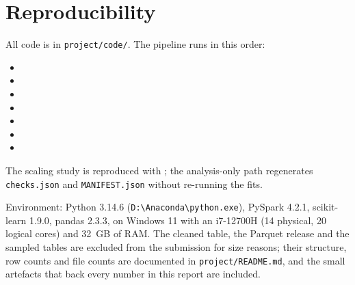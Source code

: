 \documentclass[11pt,a4paper]{article}
\newcommand{\code}[1]{\texttt{\small #1}}
\begin{document}
\section*{Reproducibility}

All code is in \code{project/code/}. The pipeline runs in this order:
\begin{itemize}
\item {}
\item {}
\item {}
\item {}
\item {}
\item {}
\item {}
\end{itemize}
The scaling study is reproduced with ; the analysis-only path regenerates \code{checks.json} and \code{MANIFEST.json} without re-running the fits.

Environment: Python 3.14.6 (\code{D:\textbackslash Anaconda\textbackslash python.exe}), PySpark 4.2.1, scikit-learn 1.9.0, pandas 2.3.3, on Windows 11 with an i7-12700H (14 physical, 20 logical cores) and 32~GB of RAM. The cleaned table, the Parquet release and the sampled tables are excluded from the submission for size reasons; their structure, row counts and file counts are documented in \code{project/README.md}, and the small artefacts that back every number in this report are included.
\end{document}
